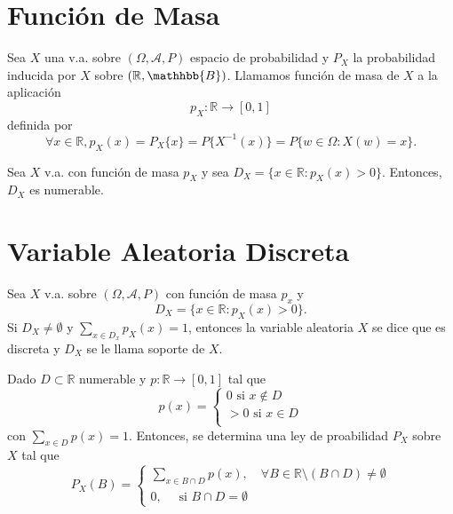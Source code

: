 \section{Función de Masa}

\begin{defn}
  Sea $X$ una v.a. sobre $(\Omega, \mathcal{A}, P )$ espacio de probabilidad y $P_{X}$ la probabilidad inducida por $X$ sobre $(\mathbb{R}, \mathhbb{B})$. Llamamos función de masa de $X$ a la aplicación
  \[ 
    p_{X} : \mathbb{R} \to [0,1] 
  \] 
  definida por
  \[ 
    \forall x \in \mathbb{R}, p_{X}(x) = P_{X}\{ x \} = P \{  X^{-1}(x)  \} = P \{  w \in \Omega :  X(w) = x \}.
  \] 
\end{defn}

\begin{prop}
  Sea $X$ v.a. con función de masa $p_{X}$ y sea $D_{X} = \{ x \in \mathbb{R} : p_{X}(x) > 0 \}$. Entonces, $D_{X}$ es numerable.
\end{prop}

\section{Variable Aleatoria Discreta}

\begin{defn}
  Sea $X$ v.a. sobre $(\Omega, \mathcal{A}, P )$ con función de masa $p_{x}$ y
  \[
    D_{X} = \{  x \in \mathbb{R}: p_{X}(x) > 0 \}.
  \]
  Si $D_{X} \neq \emptyset$ y $\sum_{x \in D_{x}} p_{X}(x) = 1$, entonces la variable aleatoria $X$ se dice que es discreta y $D_{X}$ se le llama soporte de $X$.
\end{defn}

\begin{prop}
  Dado $D \subset \mathbb{R}$ numerable y $p :  \mathbb{R} \to [0, 1]$ tal que
  \[
    p(x)  =
    \begin{cases}
      0 \text{ si } x \not \in D \\
      >0 \text{ si } x \in D \\
    \end{cases}
  \]
  con $\sum_{x \in D} p(x) = 1$. Entonces, se determina una ley de proabilidad $P_{X}$ sobre $X$ tal que
  \[ 
    P_{X}(B)  =
    \begin{cases}
      \sum_{x \in B \cap D} p(x), \quad \forall B \in \mathbb{R} \setminus (B \cap D) \neq \emptyset \\
      0, \quad \text{ si } B \cap D = \emptyset
    \end{cases} 
  \] 
\end{prop}

